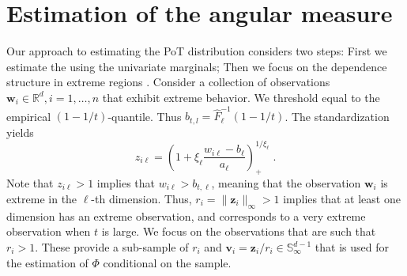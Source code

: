 \section{Estimation of the angular measure\label{sec:methodology}}

Our approach to estimating the PoT distribution considers two 
steps: First we estimate the  using the univariate  marginals; Then 
we focus on the dependence structure in extreme regions . Consider a collection of 
observations  $\bm{w}_i \in {\mathbb R}^d, i = 1, \ldots, n$ that exhibit 
extreme behavior.  We  threshold equal to the empirical $(1-1/t)$-quantile. 
Thus $b_{t,l}  = \hat{F}^{-1}_{\ell}(1 - 1/t)$.  The   standardization  yields
\begin{equation}
        \label{eqn:standardization}
        z_{i\ell} = \left(1 + \xi_{\ell}\frac{w_{i\ell} -
            b_{\ell}}{a_{\ell}}\right)_{+}^{1/\xi_{\ell}}\; .
    \end{equation}
Note that  $z_{i\ell}> 1$ implies that $w_{i\ell} > b_{t,\ell}$, meaning 
that the  observation $\bm{w}_i$ is extreme in the $\ell$-th dimension. 
Thus, $r_i = \|\bm{z}_i\|_\infty > 1$ implies that at
least one dimension has an extreme observation, and corresponds 
to a very extreme observation when $t$ is large. We focus on 
the observations that are such that $r_i > 1$. These provide a
sub-sample of $r_i$ and $\bm{v}_i = \bm{z}_i /r_i \in 
\mathbb{S}_{\infty}^{d-1}$ that is used for  the estimation of 
$\Phi$ conditional on the sample. 



